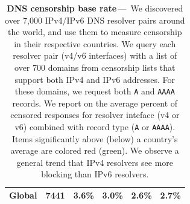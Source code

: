 {\begin{table}[ht]
{\begin{tabular}{lccccc}
                \hline
                \textbf{Global}            & \textbf{ 7441} & \textbf{3.6\%} & \textbf{3.0\%} & \textbf{2.6\%} & \textbf{2.7\%} \\
                \bottomrule
        \end{tabular}
        }
        \caption{\textbf{DNS censorship base rate}\,---\,%
            We discovered over 7,000 IPv4/IPv6 DNS resolver pairs around the world, and
            use them to measure censorship in their respective countries.
            We query each resolver pair (v4/v6 interfaces) with a list of over 700 domains
            from censorship lists that support both IPv4 and IPv6 addresses. For these domains,
            we request both \texttt{A} and \texttt{AAAA} records. We report on the average percent of censored
            responses for resolver inteface (v4 or v6) combined with record type (\texttt{A} or \texttt{AAAA}). Items significantly above (below) a country's average are colored red (green). We observe a general trend that IPv4 resolvers see more blocking than IPv6 resolvers.
            }
        \label{tab:base-rate}
    \end{table}
}


